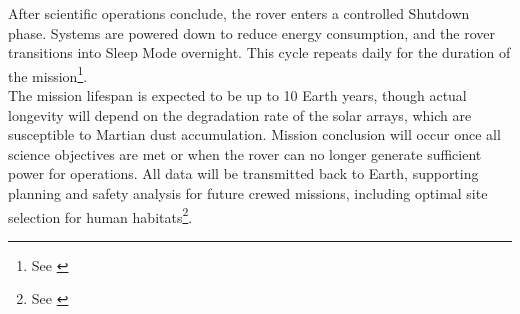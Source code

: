 After scientific operations conclude, the rover enters a controlled Shutdown phase. Systems are powered down to reduce energy consumption, and the rover transitions into Sleep Mode overnight. This cycle repeats daily for the duration of the mission\footnote{See \cite{nasa_mer_timeline}}.\\

The mission lifespan is expected to be up to 10 Earth years, though actual longevity will depend on the degradation rate of the solar arrays, which are susceptible to Martian dust accumulation. Mission conclusion will occur once all science objectives are met or when the rover can no longer generate sufficient power for operations. All data will be transmitted back to Earth, supporting planning and safety analysis for future crewed missions, including optimal site selection for human habitats\footnote{See \cite{nasa_m2m_objectives}}.